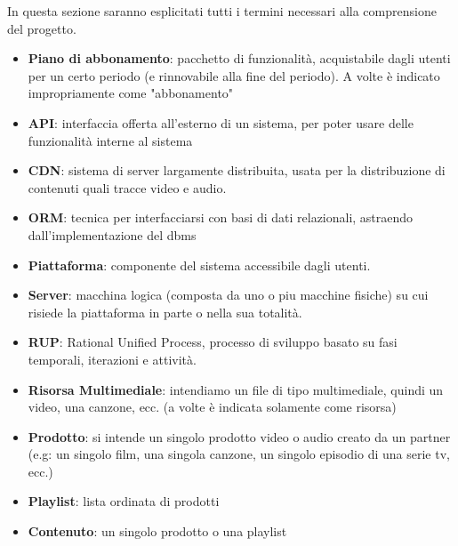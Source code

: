  In questa sezione saranno esplicitati tutti i termini necessari alla comprensione del progetto.

\begin{itemize}
	\item \textbf{Piano di abbonamento}: pacchetto di funzionalità, acquistabile dagli utenti per un certo periodo (e rinnovabile alla fine del periodo). A volte è indicato impropriamente come "abbonamento"
	\item \textbf{API}: interfaccia offerta all'esterno di un sistema, per poter usare delle funzionalità interne al sistema
	\item \textbf{CDN}: sistema di server largamente distribuita, usata per la distribuzione di contenuti quali tracce video e audio.
	\item \textbf{ORM}: tecnica per interfacciarsi con basi di dati relazionali, astraendo dall'implementazione del dbms
	\item \textbf{Piattaforma}: componente del sistema accessibile dagli utenti.
	\item \textbf{Server}: macchina logica (composta da uno o piu macchine fisiche) su cui risiede la piattaforma in parte o nella sua totalità.
	\item \textbf{RUP}: Rational Unified Process, processo di sviluppo basato su fasi temporali, iterazioni e attività.
	\item \textbf{Risorsa Multimediale}: intendiamo un file di tipo multimediale, quindi un video, una canzone, ecc. (a volte è indicata solamente come risorsa)
	\item \textbf{Prodotto}: si intende un singolo prodotto video o audio creato da un partner (e.g: un singolo film, una singola canzone, un singolo episodio di una serie tv, ecc.)
	\item \textbf{Playlist}: lista ordinata di prodotti
	\item \textbf{Contenuto}: un singolo prodotto o una playlist
\end{itemize}